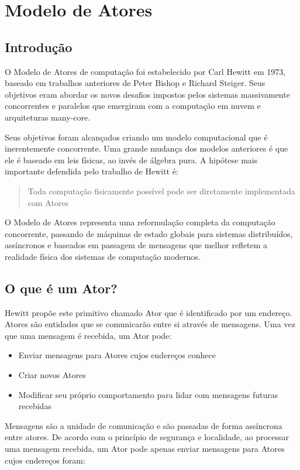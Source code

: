 \chapter{Modelo de Atores}

\section{Introdução}

O Modelo de Atores de computação foi estabelecido por Carl Hewitt em 1973, baseado em trabalhos anteriores de Peter Bishop e Richard Steiger. Seus objetivos eram abordar os novos desafios impostos pelos sistemas massivamente concorrentes e paralelos que emergiram com a computação em nuvem e arquiteturas many-core.

Seus objetivos foram alcançados criando um modelo computacional que é inerentemente concorrente. Uma grande mudança dos modelos anteriores é que ele é baseado em leis físicas, ao invés de álgebra pura. A hipótese mais importante defendida pelo trabalho de Hewitt é:

\begin{quote}
Toda computação fisicamente possível pode ser diretamente implementada com Atores
\end{quote}

O Modelo de Atores representa uma reformulação completa da computação concorrente, passando de máquinas de estado globais para sistemas distribuídos, assíncronos e baseados em passagem de mensagens que melhor refletem a realidade física dos sistemas de computação modernos.

\section{O que é um Ator?}

Hewitt propõe este primitivo chamado Ator que é identificado por um endereço. Atores são entidades que se comunicarão entre si através de mensagens. Uma vez que uma mensagem é recebida, um Ator pode:

\begin{itemize}
    \item Enviar mensagens para Atores cujos endereços conhece
    \item Criar novos Atores
    \item Modificar seu próprio comportamento para lidar com mensagens futuras recebidas
\end{itemize}

Mensagens são a unidade de comunicação e são passadas de forma assíncrona entre atores. De acordo com o princípio de segurança e localidade, ao processar uma mensagem recebida, um Ator pode apenas enviar mensagens para Atores cujos endereços foram:

